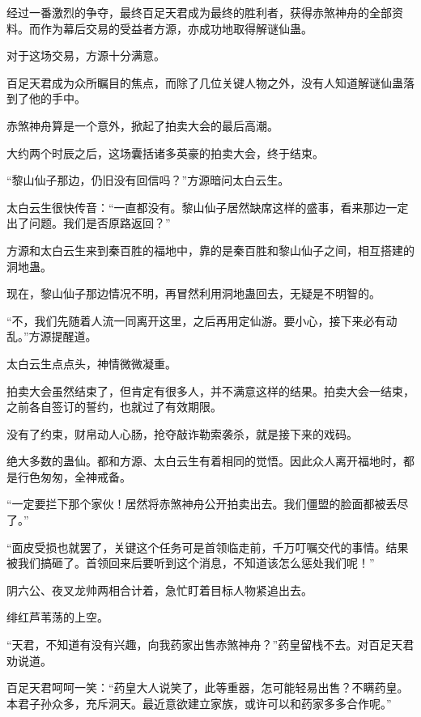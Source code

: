 
\begin{this_body}

经过一番激烈的争夺，最终百足天君成为最终的胜利者，获得赤煞神舟的全部资料。而作为幕后交易的受益者方源，亦成功地取得解谜仙蛊。

对于这场交易，方源十分满意。

百足天君成为众所瞩目的焦点，而除了几位关键人物之外，没有人知道解谜仙蛊落到了他的手中。

赤煞神舟算是一个意外，掀起了拍卖大会的最后高潮。

大约两个时辰之后，这场囊括诸多英豪的拍卖大会，终于结束。

“黎山仙子那边，仍旧没有回信吗？”方源暗问太白云生。

太白云生很快传音：“一直都没有。黎山仙子居然缺席这样的盛事，看来那边一定出了问题。我们是否原路返回？”

方源和太白云生来到秦百胜的福地中，靠的是秦百胜和黎山仙子之间，相互搭建的洞地蛊。

现在，黎山仙子那边情况不明，再冒然利用洞地蛊回去，无疑是不明智的。

“不，我们先随着人流一同离开这里，之后再用定仙游。要小心，接下来必有动乱。”方源提醒道。

太白云生点点头，神情微微凝重。

拍卖大会虽然结束了，但肯定有很多人，并不满意这样的结果。拍卖大会一结束，之前各自签订的誓约，也就过了有效期限。

没有了约束，财帛动人心肠，抢夺敲诈勒索袭杀，就是接下来的戏码。

绝大多数的蛊仙。都和方源、太白云生有着相同的觉悟。因此众人离开福地时，都是行色匆匆，全神戒备。

“一定要拦下那个家伙！居然将赤煞神舟公开拍卖出去。我们僵盟的脸面都被丢尽了。”

“面皮受损也就罢了，关键这个任务可是首领临走前，千万叮嘱交代的事情。结果被我们搞砸了。首领回来后要听到这个消息，不知道该怎么惩处我们呢！”

阴六公、夜叉龙帅两相合计着，急忙盯着目标人物紧追出去。

绯红芦苇荡的上空。

“天君，不知道有没有兴趣，向我药家出售赤煞神舟？”药皇留栈不去。对百足天君劝说道。

百足天君呵呵一笑：“药皇大人说笑了，此等重器，怎可能轻易出售？不瞒药皇。本君子孙众多，充斥洞天。最近意欲建立家族，或许可以和药家多多合作呢。”


\end{this_body}
